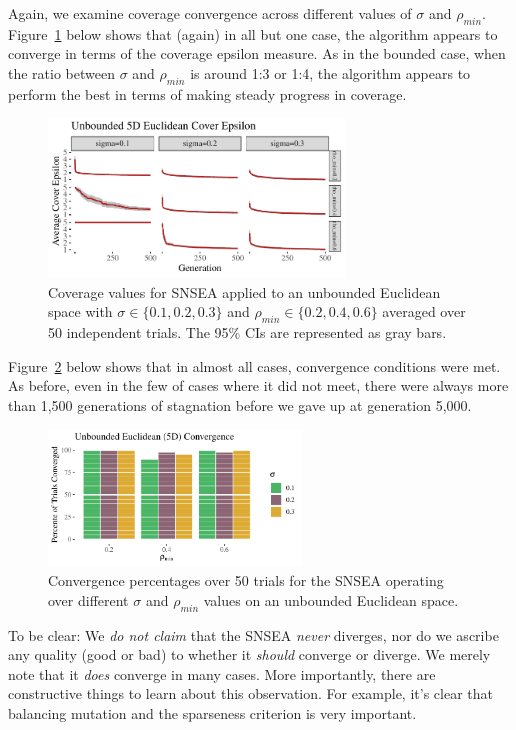 \documentclass[twoside]{article}
\begin{document}
Again, we examine coverage convergence across different values of $\sigma$ and $\rho_{min}$.  Figure~\ref{fig:unbounded:nopop:sm} below shows that (again) in all but one case, the algorithm appears to converge in terms of the coverage epsilon measure.  As in the bounded case, when the ratio between $\sigma$ and $\rho_{min}$ is around 1:3 or 1:4, the algorithm appears to perform the best in terms of making steady progress in coverage.  
%
\begin{figure}[ht]
  \center\includegraphics[width=0.7\textwidth]{Figures/unbounded-500sm-NOPOP.pdf}
  \caption{\label{fig:unbounded:nopop:sm} Coverage values for SNSEA applied to an unbounded Euclidean space with $\sigma\in\{0.1, 0.2, 0.3\}$ and $\rho_{min} \in \{0.2, 0.4, 0.6\}$ averaged over 50 independent trials.  The 95\% CIs are represented as gray bars.}
\end{figure}

Figure~\ref{fig:bounded:nopop:conv2} below shows that in almost all cases, convergence conditions were met.  As before, even in the few of cases where it did not meet, there were always more than 1,500 generations of stagnation before we gave up at generation 5,000.  
%
\begin{figure}[ht]
  \center\includegraphics[width=0.6\textwidth]{Figures/unbounded-conv-NOPOP.pdf}
  \caption{\label{fig:bounded:nopop:conv2} Convergence percentages over 50 trials for the SNSEA operating over different $\sigma$ and $\rho_{min}$ values on an unbounded Euclidean space.}
\end{figure}

To be clear:  We \emph{do not claim} that the SNSEA \emph{never} diverges, nor do we ascribe any quality (good or bad) to whether it \emph{should} converge or diverge.  We merely note that it \emph{does} converge in many cases.  More importantly, there are constructive things to learn about this observation.  For example, it's clear that balancing mutation and the sparseness criterion is very important.  
\end{document}
